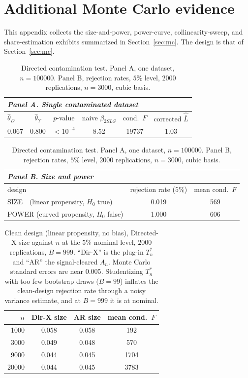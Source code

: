 \documentclass[preprint,11pt,authoryear]{elsarticle}
\theoremstyle{definition}
\begin{document}
\section{Additional Monte Carlo evidence}\label{app:mc}

This appendix collects the size-and-power, power-curve, collinearity-sweep, and
share-estimation exhibits summarized in Section~\ref{sec:mc}. The design is that of
Section~\ref{sec:mc}.

\begin{table}[h]\centering
\caption{Directed contamination test. Panel A, one dataset, $n=\num{100000}$.
Panel B, rejection rates, $5\%$ level, $\num{2000}$ replications, $n=3000$, cubic basis.}
\label{tab:sizepower}
\begin{tabular}{lccccc}
\multicolumn{6}{l}{\emph{Panel A. Single contaminated dataset}}\\
\toprule
$\hat\theta_D$ & $\hat\theta_Y$ & $p$-value & naive $\beta_{2SLS}$ & cond.\ $F$ & corrected $\hat{\bar L}$\\
\midrule
0.067 & 0.800 & $<10^{-4}$ & 8.52 & \num{19737} & 1.03\\
\bottomrule
\end{tabular}

\vspace{1em}
\begin{tabular}{lcc}
\multicolumn{3}{l}{\emph{Panel B. Size and power}}\\
\toprule
design & rejection rate ($5\%$) & mean cond.\ $F$\\
\midrule
SIZE\ \ (linear propensity, $H_0$ true)   & 0.019 & 569\\
POWER (curved propensity, $H_0$ false)     & 1.000 & 606\\
\bottomrule
\end{tabular}
\end{table}

\begin{table}[h]\centering
\caption{Clean design (linear propensity, no bias), Directed-X size against $n$ at the
$5\%$ nominal level, $\num{2000}$ replications, $B=999$. ``Dir-X'' is the plug-in
$T_n^{\ast}$ and ``AR'' the signal-cleared $A_n$. Monte Carlo standard errors are near
$0.005$. Studentizing $T_n^{\ast}$ with too few bootstrap draws ($B=99$) inflates the
clean-design rejection rate through a noisy variance estimate, and at $B=999$ it is at
nominal.}
\label{tab:nsweep}
\begin{tabular}{rccc}
\toprule
$n$ & Dir-X size & AR size & mean cond.\ $F$\\
\midrule
\num{1000}  & 0.058 & 0.058 & 192\\
\num{3000}  & 0.049 & 0.048 & 570\\
\num{9000}  & 0.044 & 0.045 & \num{1704}\\
\num{20000} & 0.044 & 0.045 & \num{3783}\\
\bottomrule
\end{tabular}
\end{table}
\end{document}
